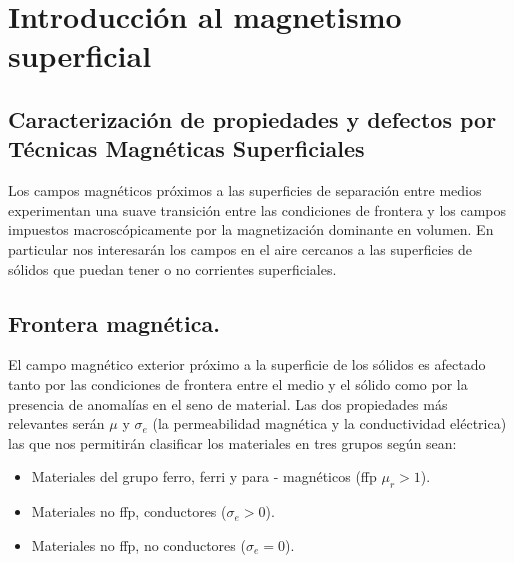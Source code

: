 
\chapter{Introducción al magnetismo superficial} %

\label{Chapter5} %




\section{Caracterización de propiedades y defectos por Técnicas Magnéticas Superficiales}

Los campos magnéticos próximos a las superficies de separación entre medios experimentan una suave transición entre las condiciones de frontera  y los campos impuestos macroscópicamente por la magnetización dominante en volumen. En particular nos interesarán los campos en el aire cercanos a las superficies de sólidos que puedan tener o no corrientes superficiales.


\section{Frontera magnética.}

El campo magnético exterior próximo a la superficie de los sólidos es afectado tanto por las condiciones de frontera entre el medio y el sólido como por la presencia de anomalías en el seno de material. Las dos propiedades más relevantes serán $\mu$ y $\sigma_{e}$ (la permeabilidad magnética y la conductividad eléctrica) las que nos permitirán clasificar los materiales en tres grupos según sean:

\begin{itemize}
	\item Materiales del grupo ferro, ferri y para - magnéticos (ffp $\mu_{r}>1$). 	
	\item Materiales no ffp, conductores ($\sigma_{e}>0$).
	\item Materiales no ffp, no conductores ($\sigma_{e}=0$).	
\end{itemize}


